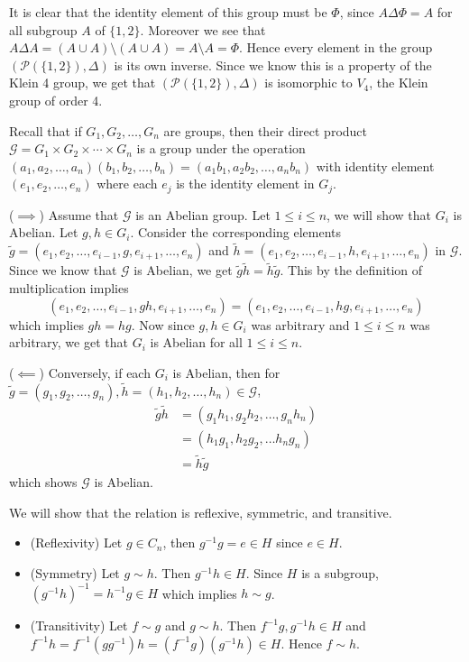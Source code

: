 \documentclass[12pt]{exam}
\theoremstyle{plain} %
\theoremstyle{definition} %
\theoremstyle{remark} %
\begin{document}
\begin{questions}
\begin{solution}
    It is clear that the identity element of this group must be $\Phi$, since $A \Delta \Phi = A$ for all subgroup $A$ of $\{ 1, 2 \}$. Moreover we see that $A \Delta A = (A \cup A) \setminus (A\cup A)= A \setminus A = \Phi$. Hence every element in the group $(\mathcal{P}(\{ 1, 2 \}), \Delta)$ is its own inverse. Since we know this is a property of the Klein 4 group, we get that $(\mathcal{P}(\{ 1, 2 \}), \Delta)$ is isomorphic to $V_4$, the Klein group of order 4.
  \end{solution}


  \question
  \begin{solution}
    Recall that if $G_1, G_2, \ldots , G_n$ are groups, then their direct product $\mathcal{G} = G_1 \times G_2 \times \cdots \times G_n$ is a group under the operation $(a_1, a_2, \ldots , a_n)( b_1, b_2, \ldots , b_n) = (a_1b_1, a_2b_2, \ldots , a_nb_n)$ with identity element $(e_1, e_2, \ldots, e_n)$ where each $e_j$ is the identity element in $G_j$.

    ($\implies$) Assume that $\mathcal{G}$ is an Abelian group. Let $1 \le i \le n$, we will show that $G_i$ is Abelian. Let $g, h \in G_i$. Consider the corresponding elements $\tilde{g} = (e_1, e_2, \ldots, e_{i-1}, g, e_{i+1}, \ldots  ,e_n)$ and $\tilde{h} = (e_1, e_2, \ldots, e_{i-1}, h, e_{i+1}, \ldots  ,e_n)$ in $\mathcal{G}$. Since we know that $\mathcal{G}$ is Abelian, we get $\tilde{ g}\tilde{h} = \tilde{h}\tilde{g}$. This by the definition of multiplication implies $$(e_1, e_2, \ldots, e_{i-1}, gh, e_{i+1}, \ldots  ,e_n) = (e_1, e_2, \ldots, e_{i-1}, hg, e_{i+1}, \ldots  ,e_n)$$
    which implies $gh = hg$. Now since $g, h \in G_i$ was arbitrary and $1 \le i \le n$ was arbitrary, we get that $G_i$ is Abelian for all $1 \le i \le n$.

    ($\impliedby$) Conversely, if each $G_i$ is Abelian, then for $\tilde{g} = (g_1 , g_2 , \ldots , g_n), \tilde{h} = (h_1 , h_2 , \ldots , h_n) \in \mathcal{G}$, \begin{align*}
      \tilde{g}\tilde{h} &= (g_1h_1, g_2h_2, \ldots, g_nh_n) \\
      &=(h_1g_1, h_2g_2, \ldots h_ng_n) \\
      &= \tilde{h}\tilde{g}
    \end{align*}
    which shows $\mathcal{G}$ is Abelian.
  \end{solution}

  \question
  \begin{solution}
    We will show that the relation is reflexive, symmetric, and transitive.
    \begin{itemize}[]
      \item (Reflexivity) Let $g \in C_n$, then $g^{-1}g = e \in H$ since $ e \in H$.
      \item (Symmetry) Let $g \sim h$. Then $ g^{-1}h \in H$. Since $H$ is a subgroup, $(g^{-1}h)^{-1} = h^{-1}g \in H$ which implies $ h \sim g$.
      \item (Transitivity) Let $f \sim g$ and $g \sim h$. Then $f^{-1}g, g^{-1}h \in H$ and $f^{-1}h = f^{-1}(gg^{-1})h = (f^{-1}g)(g^{-1}h) \in H$. Hence $f \sim h$.
    \end{itemize}
  \end{solution}


\end{questions}
\end{document}
